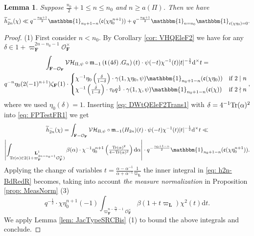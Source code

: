 \documentclass[A4]{amsart}
\def\leq{\leqslant}
\def\geq{\geqslant}
\newtheorem{lemma}      [theorem]{Lemma}
\numberwithin{equation}{section} \everymath{\displaystyle}
\newcommand{\Tr}{{\rm Tr}}
\newcommand{\id}{\mathbbm{1}}
\newcommand{\ud}{\mathrm{d}}
\newcommand{\F}{\mathbf{F}}
\newcommand{\bL}{\mathbf{L}}
\newcommand{\vO}{\mathcal{O}}
\newcommand{\norm}[1][\cdot]{\lvert #1 \rvert}
\newcommand{\extnorm}[1]{\left\lvert #1 \right\rvert}
\newcommand{\Mult}{\mathfrak{m}}
\newcommand{\VorH}{\mathcal{VH}}
\newcommand{\Trans}{\mathfrak{t}}
\newcommand{\cond}{\mathfrak{c}}
\begin{document}
\begin{lemma} \label{lem: e2DWt-FineBd1}
	Suppose $\tfrac{n_0}{2} + 1 \leq n \leq n_0$ and $n \geq a(\Pi)$. Then we have
	$$ \widetilde{h}_{2n}^-(\chi) \ll q^{-\frac{n_0+1}{2}} \id_{n_0+1-n}(\cond(\chi \eta_0^{n+1})) + q^{-\frac{n_0+1}{2}} \id_{n=n_0} \id_{\cond(\chi \eta_0)=0}. $$
\end{lemma}
\begin{proof}
	(1) First consider $n < n_0$. By Corollary \ref{cor: VHQEleF2} we have for any $\delta \in 1+\varpi_{\F}^{2n-n_0-1} \vO_{\F}^{\times}$
\begin{multline} \label{eq: DWtQEleF2Trans1}
	\int_{\F-\vO_{\F}} \VorH_{\Pi,\psi} \circ \Mult_{-1} \left( \Trans \left( 4\delta \right).G_n \right)(t) \cdot \psi(-t) \chi^{-1}(t) \norm[t]^{-\frac{1}{2}} \ud^{\times} t = \\
	q^{-n} \eta_0(2(-1)^{n+1}) \zeta_{\F}(1) \cdot \begin{cases}
		\chi^{-1} \eta_0 \left( \tfrac{\delta}{1-\delta} \right) \cdot \gamma(1,\chi \eta_0,\psi) \id_{n_0+1-n}(\cond(\chi \eta_0)) & \text{if } 2 \mid n \\
		\chi^{-1} \left( \tfrac{\delta}{1-\delta} \right) \cdot \tau_0 q^{\frac{1}{2}} \cdot \gamma(1,\chi,\psi) \id_{n_0+1-n}(\cond(\chi)) & \text{if } 2 \nmid n
	\end{cases},
\end{multline}
	where we used $\eta_0(\delta)=1$. Inserting \eqref{eq: DWtQEleF2Trans1} with $\delta = 4^{-1} \Tr(\alpha)^2$ into \eqref{eq: FPTestFR1} we get
\begin{multline} \label{eq: h2n-BdRedR}
	\widetilde{h}_{2n}^-(\chi) = \int_{\F-\vO_{\F}} \VorH_{\Pi,\psi} \circ \Mult_{-1} (H_{2n})(t) \cdot \psi(-t) \chi^{-1}(t) \norm[t]^{-\frac{1}{2}} \ud^{\times} t \ll \\
	\extnorm{\int_{\substack{\bL^1 \\ \Tr(\alpha) \in 2(1+\varpi_{\F}^{2n-n_0-1} \vO_{\F}^{\times})}} \beta(\alpha) \cdot \chi^{-1} \eta_0^{n+1} \left( \tfrac{\Tr(\alpha)^2}{4-\Tr(\alpha)^2} \right) \ud \alpha} \cdot q^{-\frac{n_0+1-n}{2}} \id_{n_0+1-n}(\cond(\chi \eta_0^{n+1})).
\end{multline}
	Applying the change of variables $t = \tfrac{\alpha - \alpha^{-1}}{\alpha + \alpha^{-1}} \tfrac{1}{\varpi_{\bL}}$ the inner integral in \eqref{eq: h2n-BdRedR} becomes, taking into account \emph{the measure normalization} in Proposition \ref{prop: MeasNorm} (3)
	$$ q^{-\frac{1}{2}} \cdot \chi\eta_0^{n+1}(-1) \int_{\varpi_{\F}^{n-\frac{n_0}{2}-1} \vO_{\F}^{\times}} \beta(1+t\varpi_{\bL}) \chi^2(t) \ud t. $$
	We apply Lemma \ref{lem: JacTypeSRCBis} (1) to bound the above integrals and conclude.
	

\end{proof}
\end{document}
